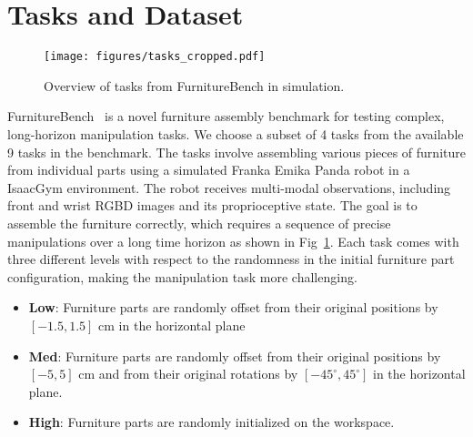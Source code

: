\documentclass{article} %
\begin{document}



\newpage
\appendix
\section{Tasks and Dataset}
\label{app:task}
\begin{figure}[h]
    \centering
    \texttt{[image: figures/tasks\_cropped.pdf]}
    \caption{Overview of tasks from FurnitureBench in simulation. }
    \label{fig:tasks}
\end{figure}

FurnitureBench~\citep{heo2025furniturebench} is a novel furniture assembly benchmark for testing complex, long-horizon manipulation tasks. We choose a subset of 4 tasks from the available 9 tasks in the benchmark. The tasks involve assembling various pieces of furniture from individual parts using a simulated Franka Emika Panda robot in a IsaacGym environment. The robot receives multi-modal observations, including front and wrist RGBD images and its proprioceptive state. The goal is to assemble the furniture correctly, which requires a sequence of precise manipulations over a long time horizon as shown in Fig~\ref{fig:tasks}. Each task comes with three different levels with respect to the randomness in the initial furniture part configuration, making the manipulation task more challenging.
\begin{itemize}
    \item \textbf{Low}: Furniture parts are randomly offset from their original positions by $[-1.5, 1.5]$ cm in the horizontal plane
    \item \textbf{Med}: Furniture parts are randomly offset from their original positions by $[-5, 5]$ cm and from their original rotations by $[-45^\circ, 45^\circ]$ in the horizontal plane.
    \item \textbf{High}: Furniture parts are randomly initialized on the workspace.
\end{itemize}
\end{document}
